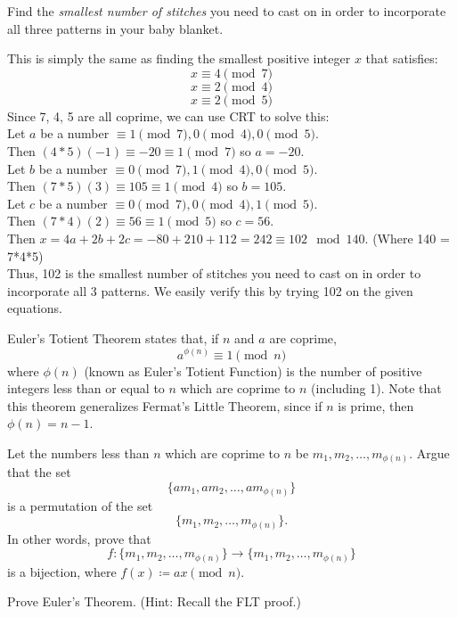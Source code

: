 \documentclass[11pt]{article}
\begin{document}
Find the \emph{smallest number of stitches} you need to cast on in
order to incorporate all three patterns in your baby blanket.

\begin{solution}
This is simply the same as finding the smallest positive integer $x$ that satisfies:
$$x\equiv4\pmod7$$
$$x\equiv2\pmod4$$
$$x\equiv2\pmod5$$
Since 7, 4, 5 are all coprime, we can use CRT to solve this:
\\Let $a$ be a number $\equiv1\pmod{7},0\pmod4,0\pmod5$.
\\Then $(4*5)(-1)\equiv-20\equiv1\pmod7$ so $a=-20$.
\\Let $b$ be a number $\equiv0\pmod{7},1\pmod4,0\pmod5$.
\\Then $(7*5)(3)\equiv105\equiv1\pmod4$ so $b=105$.
\\Let $c$ be a number $\equiv0\pmod{7},0\pmod4,1\pmod5$.
\\Then $(7*4)(2)\equiv56\equiv1\pmod5$ so $c=56$.
\\Then $x=4a+2b+2c=-80+210+112=242\equiv102\mod140$.
(Where 140 = 7*4*5)
\\Thus, 102 is the smallest number of stitches you need to cast on in order to incorporate all 3 patterns.
We easily verify this by trying 102 on the given equations.
\end{solution}\newpage


Euler's Totient Theorem states that, if $n$ and $a$ are coprime,
\[
  a^{\phi(n)} \equiv 1 \pmod{n}
\]
where $\phi(n)$ (known as Euler's Totient Function) is the number of positive
integers less than or equal to $n$ which are coprime to $n$ (including 1). Note that this theorem generalizes Fermat's Little Theorem, since if $n$ is prime, then $\phi(n) = n - 1$. 

\begin{Parts}
  \Part Let the numbers less than $n$ which are coprime to $n$ be $m_1, m_2, \ldots, m_{\phi(n)}$. 
  Argue that the set
  \[\{am_1, am_2, \ldots, am_{\phi(n)}\}\]
  is a permutation of the set
  \[\{m_1, m_2, \ldots, m_{\phi(n)}\}.\]
  In other words, prove that 
  \[f:\{m_1, m_2, \ldots, m_{\phi(n)}\} \to \{m_1, m_2, \ldots, m_{\phi(n)}\}\]
  is a bijection, where $f(x) \coloneqq ax \pmod{n}$.

  \Part Prove Euler's Theorem. (Hint: Recall the FLT proof.)
\end{Parts}
\end{document}
